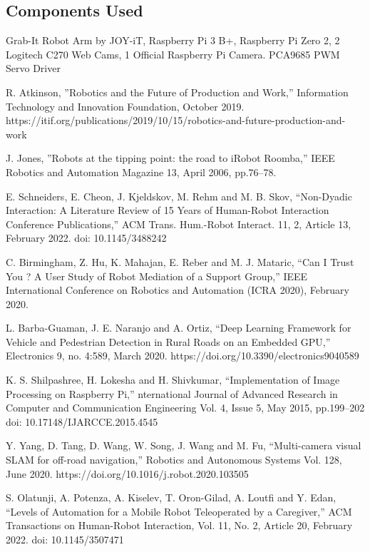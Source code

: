 \documentclass[conference]{IEEEtran}
\begin{document}
\subsection{Components Used}
Grab-It Robot Arm by JOY-iT, Raspberry Pi 3 B+, Raspberry Pi Zero 2, 2 Logitech C270 Web Cams, 1 Official Raspberry Pi Camera. PCA9685 PWM Servo Driver

\begin{thebibliography}{00}
 R. Atkinson, ''Robotics and the Future of Production and Work,'' Information Technology and Innovation Foundation, October 2019. https://itif.org/publications/2019/10/15/robotics-and-future-production-and-work

 J. Jones, ''Robots at the tipping point: the road to iRobot Roomba,'' IEEE Robotics and Automation Magazine 13, April 2006, pp.76--78.

 E. Schneiders, E. Cheon, J. Kjeldskov, M. Rehm and M. B. Skov, ``Non-Dyadic Interaction: A Literature Review of 15 Years of Human-Robot Interaction Conference Publications,'' ACM Trans. Hum.-Robot Interact. 11, 2, Article 13, February 2022. doi: 10.1145/3488242

 C. Birmingham, Z. Hu, K. Mahajan, E. Reber and M. J. Mataric, ``Can I Trust You ? A User Study of Robot Mediation of a Support Group,'' 	IEEE International Conference on Robotics and Automation (ICRA 2020), February 2020.

 L. Barba-Guaman, J. E. Naranjo and A. Ortiz, ``Deep Learning Framework for Vehicle and Pedestrian Detection in Rural Roads on an Embedded GPU,'' Electronics 9, no. 4:589, March 2020. https://doi.org/10.3390/electronics9040589

 K. S. Shilpashree, H. Lokesha and H. Shivkumar, ``Implementation of Image Processing on Raspberry Pi,'' nternational Journal of Advanced Research in Computer and Communication Engineering Vol. 4, Issue 5, May 2015, pp.199--202 doi: 10.17148/IJARCCE.2015.4545

 Y. Yang, D. Tang, D. Wang, W. Song, J. Wang and M. Fu, ``Multi-camera visual SLAM for off-road navigation,'' Robotics and Autonomous Systems Vol. 128, June 2020. https://doi.org/10.1016/j.robot.2020.103505

 S. Olatunji, A. Potenza, A. Kiselev, T. Oron-Gilad, A. Loutfi and Y. Edan, ``Levels of Automation for a Mobile Robot Teleoperated by a Caregiver,'' ACM Transactions on Human-Robot Interaction, Vol. 11, No. 2, Article 20, February 2022. doi: 10.1145/3507471


\end{thebibliography}
\end{document}
